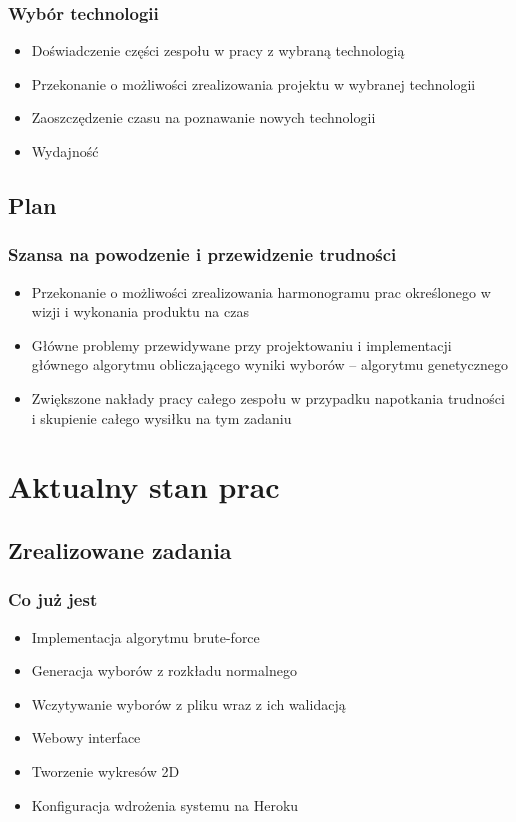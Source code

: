 \documentclass{beamer}
\begin{document}
\begin{frame}

\frametitle{Wybór technologii}
\begin{itemize}
\item Doświadczenie części zespołu w pracy z wybraną technologią
\item Przekonanie o możliwości zrealizowania projektu w wybranej technologii
\item Zaoszczędzenie czasu na poznawanie nowych technologii
\item Wydajność
\end{itemize}

\end{frame}


\subsection{Plan}

\begin{frame}

\frametitle{Szansa na powodzenie i przewidzenie trudności}
\begin{itemize}
\item Przekonanie o możliwości zrealizowania harmonogramu prac określonego w wizji i wykonania produktu na czas
\item Główne problemy przewidywane przy projektowaniu i implementacji głównego algorytmu obliczającego wyniki wyborów – algorytmu genetycznego
\item Zwiększone nakłady pracy całego zespołu w przypadku napotkania trudności i skupienie całego wysiłku na tym zadaniu
\end{itemize}

\end{frame}


\section{Aktualny stan prac}

\subsection{Zrealizowane zadania}

\begin{frame}

\frametitle{Co już jest}
\begin{itemize}
\item Implementacja algorytmu brute-force
\item Generacja wyborów z rozkładu normalnego
\item Wczytywanie wyborów z pliku wraz z ich walidacją
\item Webowy interface
\item Tworzenie wykresów 2D
\item Konfiguracja wdrożenia systemu na Heroku
\end{itemize}

\end{frame}
\end{document}
